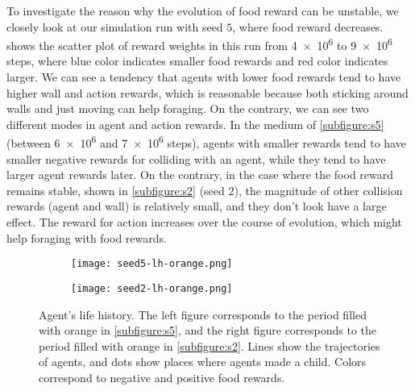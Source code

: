 To investigate the reason why the evolution of food reward can be unstable, we closely look at our simulation run with seed $5$, where food reward decreases.  shows the scatter plot of reward weights in this run from \num{4e6} to \num{9e6} steps, where blue color indicates smaller food rewards and red color indicates larger. We can see a tendency that agents with lower food rewards tend to have higher wall and action rewards, which is reasonable because both sticking around walls and just moving can help foraging. On the contrary, we can see two different modes in agent and action rewards. In the medium of \cref{subfigure:s5} (between \num{6e6} and \num{7e6} steps), agents with smaller rewards tend to have smaller negative rewards for colliding with an agent, while they tend to have larger agent rewards later. On the contrary, in the case where the food reward remains stable, shown in \cref{subfigure:s2} (seed $2$), the magnitude of other collision rewards (agent and wall) is relatively small, and they don't look have a large effect. The reward for action increases over the course of evolution, which might help foraging with food rewards.

\begin{figure}[t]
  \begin{subfigure}[t]{7cm}
    \centering
    \texttt{[image: seed5-lh-orange.png]}
    \label{subfigure:s5lh}
  \end{subfigure}
  \begin{subfigure}[t]{7cm}
    \centering
    \texttt{[image: seed2-lh-orange.png]}
    \label{subfigure:s2lh}
  \end{subfigure}
  \caption{
    Agent's life history. The left figure corresponds to the period filled with orange in \cref{subfigure:s5}, and the right figure corresponds to the period filled with orange in \cref{subfigure:s2}. Lines show the trajectories of agents, and dots show places where agents made a child. Colors correspond to negative and positive food rewards.
  }\label{figure:s5-lh}
\end{figure}

